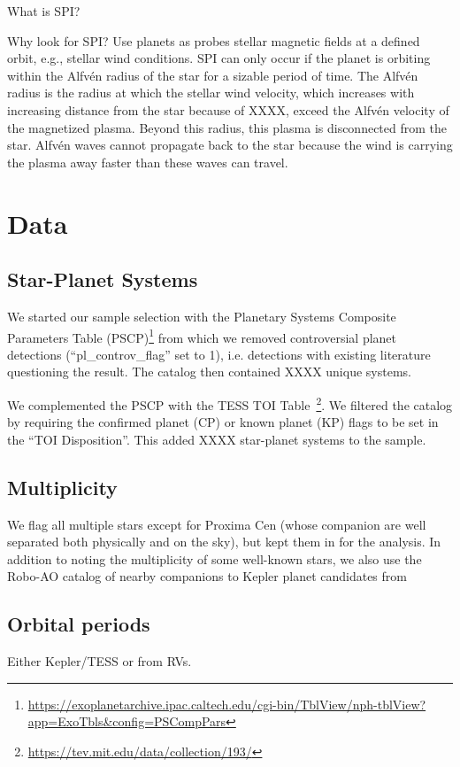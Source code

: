 \documentclass[twocolumn]{aastex631}
\begin{document}
What is SPI?

Why look for SPI? Use planets as probes stellar magnetic fields at a defined orbit, e.g., stellar wind conditions. SPI can only occur if the planet is orbiting within the Alfv\'en radius of the star for a sizable period of time. The Alfv\'en radius is the radius at which the stellar wind velocity, which increases with increasing distance from the star because of XXXX, exceed the Alfv\'en velocity of the magnetized plasma. Beyond this radius, this plasma is disconnected from the star. Alfv\'en waves cannot propagate back to the star because the wind is carrying the plasma away faster than these waves can travel.





\section{Data}
\label{sec:data}
\subsection{Star-Planet Systems}
We started our sample selection with the Planetary Systems Composite Parameters Table (PSCP)\footnote{ \url{https://exoplanetarchive.ipac.caltech.edu/cgi-bin/TblView/nph-tblView?app=ExoTbls&config=PSCompPars}} from which we removed controversial planet detections (``pl\_controv\_flag'' set to 1), i.e. detections with existing literature questioning the result. The catalog then contained XXXX unique systems.

We complemented the PSCP with the TESS TOI Table~\citep[TT][]{guerrero2021arxiv}\footnote{\url{https://tev.mit.edu/data/collection/193/}}. We filtered the catalog by requiring the confirmed planet (CP) or known planet (KP) flags to be set in the ``TOI Disposition''. This added XXXX star-planet systems to the sample.
\subsection{Multiplicity}
We flag all multiple stars except for Proxima Cen (whose companion are well separated both physically and on the sky), but kept them in for the analysis. In addition to noting the multiplicity of some well-known stars, we also use the Robo-AO catalog of nearby companions to Kepler planet candidates from ~\cite{ziegler2018measuring}


\subsection{Orbital periods}
Either Kepler/TESS or from RVs.
\end{document}
